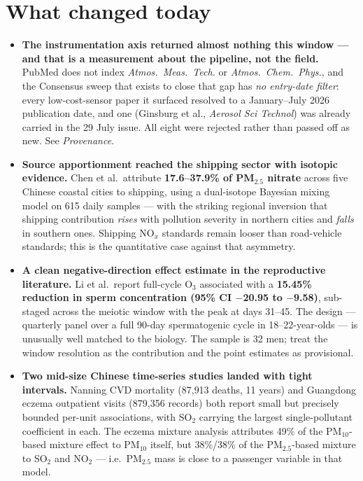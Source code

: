 \documentclass[10pt]{article}
\begin{document}
\section*{\sffamily\bfseries\color{Deep}What changed today}
\vspace{-1.5mm}{\color{Amber}\rule{\linewidth}{1.1pt}}\vspace{2.5mm}

\footnotesize
\begin{itemize}
\item \textbf{The instrumentation axis returned almost nothing this window --- and that
is a measurement about the pipeline, not the field.} PubMed does not index
\textit{Atmos.\ Meas.\ Tech.} or \textit{Atmos.\ Chem.\ Phys.}, and the Consensus sweep
that exists to close that gap has \emph{no entry-date filter}: every low-cost-sensor
paper it surfaced resolved to a January--July 2026 publication date, and one
(Ginsburg et al., \textit{Aerosol Sci Technol}) was already carried in the 29 July issue.
All eight were rejected rather than passed off as new. See \textit{Provenance}.

\item \textbf{Source apportionment reached the shipping sector with isotopic evidence.}
Chen et al.\ attribute \textbf{17.6--37.9\% of PM$_{2.5}$ nitrate} across five Chinese
coastal cities to shipping, using a dual-isotope Bayesian mixing model on 615 daily
samples --- with the striking regional inversion that shipping contribution
\emph{rises} with pollution severity in northern cities and \emph{falls} in southern
ones. Shipping NO$_x$ standards remain looser than road-vehicle standards; this is the
quantitative case against that asymmetry.

\item \textbf{A clean negative-direction effect estimate in the reproductive literature.}
Li et al.\ report full-cycle O$_3$ associated with a \textbf{15.45\% reduction in sperm
concentration (95\% CI $-$20.95 to $-$9.58)}, sub-staged across the meiotic window with
the peak at days 31--45. The design --- quarterly panel over a full 90-day spermatogenic
cycle in 18--22-year-olds --- is unusually well matched to the biology. The sample is
32 men; treat the window resolution as the contribution and the point estimates as
provisional.

\item \textbf{Two mid-size Chinese time-series studies landed with tight intervals.}
Nanning CVD mortality (87{,}913 deaths, 11 years) and Guangdong eczema outpatient visits
(879{,}356 records) both report small but precisely bounded per-unit associations, with
SO$_2$ carrying the largest single-pollutant coefficient in each. The eczema mixture
analysis attributes 49\% of the PM$_{10}$-based mixture effect to PM$_{10}$ itself, but
38\%/38\% of the PM$_{2.5}$-based mixture to SO$_2$ and NO$_2$ --- i.e.\ PM$_{2.5}$ mass
is close to a passenger variable in that model.


\end{itemize}
\end{document}
